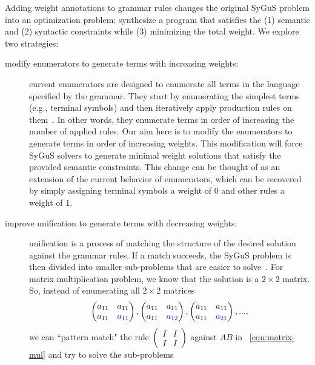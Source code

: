 Adding weight annotations to grammar rules changes the original SyGuS problem into an optimization problem:
%
synthesize a program that satisfies the (1) semantic and (2) syntactic constraints while (3) minimizing the total weight.
%
%
We explore two strategies:
%
\begin{description}
\item[modify enumerators to generate terms with increasing weights:]
%
current enumerators are designed to enumerate all terms in the language specified by the grammar.
%
They start by enumerating the simplest terms (e.g., terminal symbols) and then iteratively apply production rules on them~\cite{cvc4:2015}.
%
In other words, they enumerate terms in order of increasing the number of applied rules.
%
Our aim here is to modify the enumerators to generate terms in order of increasing weights.
%
This modification will force SyGuS solvers to generate minimal weight solutions that satisfy the provided semantic constraints.
%
This change can be thought of as an extension of the current behavior of enumerators,
%
which can be recovered by simply assigning terminal symbols a weight of 0 and other rules a weight of 1.
%
\item[improve unification to generate terms with decreasing weights:]
%
unification is a process of matching the structure of the desired solution against the grammar rules.
%
If a match succeeds, the SyGuS problem is then divided into smaller sub-problems that are easier to solve~\cite{eusolver:2017}.
%
For matrix multiplication problem, we know that the solution is a $2 \times 2$ matrix. So, instead of enumerating all $2 \times 2$ matrices
%
\begin{equation}
\begin{pmatrix} a_{11} & a_{11} \\ a_{11} & \textcolor{blue}{a_{11}} \end{pmatrix},
\begin{pmatrix} a_{11} & a_{11} \\ a_{11} & \textcolor{blue}{a_{12}} \end{pmatrix},
\begin{pmatrix} a_{11} & a_{11} \\ a_{11} & \textcolor{blue}{a_{21}} \end{pmatrix},
...,
\label{eq:sequence-matrices}
\end{equation}
%
we can ``pattern match" the rule $\begin{pmatrix} I & I \\ I & I \end{pmatrix}$ against $AB$ in ~\ref{eqn:matrix-mul} and try to solve the sub-problems

\end{description}
